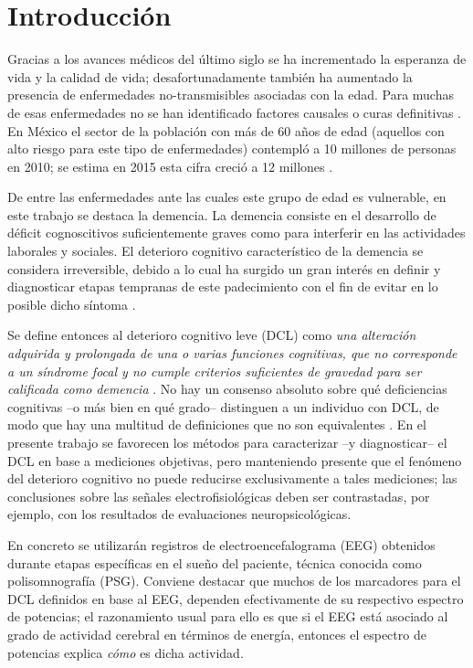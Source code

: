 
\chapter{Introducción}

Gracias a los avances médicos del último siglo se ha incrementado la esperanza de vida y la 
calidad de vida; desafortunadamente también ha aumentado la presencia de enfermedades 
no-transmisibles asociadas con la edad. 
%
Para muchas de esas enfermedades no se han identificado factores causales o curas definitivas 
\cite{PlanAlzheimer04}.
%
En México el sector de la población con más de 60 años de edad (aquellos con alto riesgo para este
tipo de enfermedades) contempló a 10 millones de personas en 2010; se estima en 2015 esta cifra 
creció a 12 millones \cite{Censo10,Intercensal15}.

De entre las enfermedades ante las cuales este grupo de edad es vulnerable, en este trabajo se 
destaca la demencia. 
%
La demencia consiste en el desarrollo de déficit cognoscitivos suficientemente graves como para 
interferir en las actividades laborales y sociales.
%
El deterioro cognitivo característico de la demencia se considera irreversible, debido a lo cual 
ha surgido un gran interés en definir y diagnosticar etapas tempranas de este padecimiento con el 
fin de evitar en lo posible dicho síntoma \cite{Knopman01}.

Se define entonces al deterioro cognitivo leve (DCL) como \textit{una alteración adquirida y 
prolongada de una o varias funciones cognitivas, que no corresponde a un síndrome focal y no cumple 
criterios suficientes de gravedad para ser calificada como demencia} \cite{Robles02}.
%
No hay un consenso absoluto sobre qué deficiencias cognitivas --o más bien en qué grado-- 
distinguen a un individuo con DCL, de modo que hay una multitud de definiciones que no son
equivalentes \cite{Petersen01}.
%
En el presente trabajo se favorecen los métodos para caracterizar --y diagnosticar-- el DCL en base 
a mediciones objetivas, pero manteniendo presente que el fenómeno del deterioro cognitivo no puede 
reducirse exclusivamente a tales mediciones; las conclusiones sobre las señales electrofisiológicas 
deben ser contrastadas, por ejemplo, con los resultados de evaluaciones neuropsicológicas.

En concreto se utilizarán registros de electroencefalograma (EEG) obtenidos durante etapas
específicas en el sueño del paciente, técnica conocida como polisomnografía (PSG).
%
Conviene destacar que muchos de los marcadores para el DCL definidos en base al EEG, dependen
efectivamente de su respectivo espectro de potencias; el razonamiento usual para ello es que si el 
EEG está asociado al grado de actividad cerebral en términos de energía, entonces el espectro de 
potencias explica \textit{cómo} es dicha actividad.

